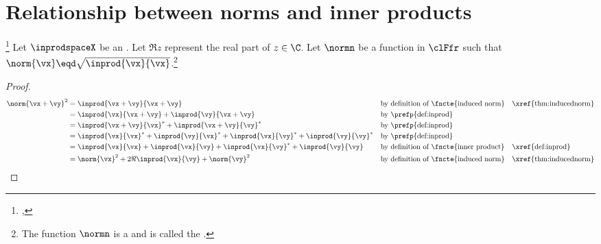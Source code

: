 \section{Relationship between norms and inner products}
\begin{lemma}
\footnote{
  ,
  }
\label{lem:||x+y||}
\label{lem:polarid}
Let $\inprodspaceX$ be an  .
Let $\Re z$ represent the real part of $z\in\C$.
Let $\normn$ be a function in $\clFfr$ such that $\norm{\vx}\eqd\sqrt{\inprod{\vx}{\vx}}$.\footnote{
The function $\normn$ is a   and is called the 
.}
\end{lemma}
\begin{proof}
\begin{align*}
   \norm{\vx+\vy}^2
     &= \inprod{\vx+\vy}{\vx+\vy}
     && \text{by definition of \fncte{induced norm}}
     && \text{\xref{thm:inducednorm}}
   \\&= \inprod{\vx}{\vx+\vy} + \inprod{\vy}{\vx+\vy}
     && \text{by \prefp{def:inprod}}
   \\&= \inprod{\vx+\vy}{\vx}^\ast + \inprod{\vx+\vy}{\vy}^\ast
     && \text{by \prefp{def:inprod}}
   \\&= \inprod{\vx}{\vx}^\ast + \inprod{\vy}{\vx}^\ast + \inprod{\vx}{\vy}^\ast + \inprod{\vy}{\vy}^\ast
     && \text{by \prefp{def:inprod}}
   \\&= \inprod{\vx}{\vx} + \inprod{\vx}{\vy} + \inprod{\vx}{\vy}^\ast + \inprod{\vy}{\vy}
     && \text{by definition of \fncte{inner product}}
     && \text{\xref{def:inprod}}
   \\&= \norm{\vx}^2 + 2\Re\inprod{\vx}{\vy} + \norm{\vy}^2
     && \text{by definition of \fncte{induced norm}}
     && \text{\xref{thm:inducednorm}}
\end{align*}
\end{proof}



